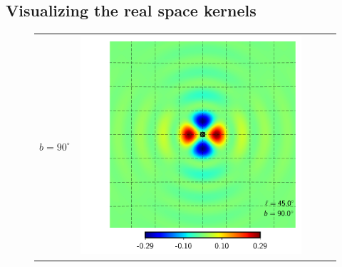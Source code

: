 \documentclass[a4paper,11pt]{article}
\begin{document}
\subsection{Visualizing the real space kernels} \label{sec:visualize_operator}
%
\setlength{\kernelfigwidth}{0.2\columnwidth}
\setlength{\kernelfigspace}{-1.8mm}


\begin{figure}[t] 
\begin{center}
\begin{tabular}{m{8ex}m{}m{}|m{}m{}}
$b=90^\circ$ &
\hspace{\kernelfigspace}\includegraphics[width=\kernelfigwidth]{qu2eb_rker_rad_lat90_lon45.pdf} &

\end{tabular}
\end{center}
\end{figure}
\end{document}
